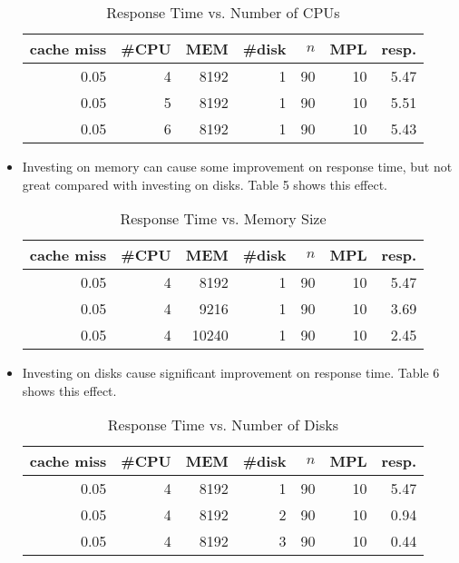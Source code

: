 \documentclass[12pt,letterpaper]{article}
\begin{document}
\begin{itemize}
\begin{table}
\begin{center}
\caption{Response Time vs. Number of CPUs}
\vspace{0.5ex}
\begin{tabular}{r|r|r|r|r|r|r}
cache miss & \#CPU & MEM & \#disk & $n$ & MPL & resp.\\
\hline
0.05 & 4 & 8192 & 1 & 90 & 10 & 5.47\\
0.05 & 5 & 8192 & 1 & 90 & 10 & 5.51\\
0.05 & 6 & 8192 & 1 & 90 & 10 & 5.43\\
\end{tabular}
\end{center}
\end{table}
\item Investing on memory can cause some improvement on response time, but not great compared with investing on disks. Table 5 shows this effect.
\begin{table}
\begin{center}
\caption{Response Time vs. Memory Size}
\vspace{0.5ex}
\begin{tabular}{r|r|r|r|r|r|r}
cache miss & \#CPU & MEM & \#disk & $n$ & MPL & resp.\\
\hline
0.05 & 4 & 8192 & 1 & 90 & 10 & 5.47\\
0.05 & 4 & 9216 & 1 & 90 & 10 & 3.69\\
0.05 & 4 & 10240 & 1 & 90 & 10 & 2.45\\
\end{tabular}
\end{center}
\end{table}
\item Investing on disks cause significant improvement on response time. Table 6 shows this effect.
\begin{table}
\begin{center}
\caption{Response Time vs. Number of Disks}
\vspace{0.5ex}
\begin{tabular}{r|r|r|r|r|r|r}
cache miss & \#CPU & MEM & \#disk & $n$ & MPL & resp.\\
\hline
0.05 & 4 & 8192 & 1 & 90 & 10 & 5.47\\
0.05 & 4 & 8192 & 2 & 90 & 10 & 0.94\\
0.05 & 4 & 8192 & 3 & 90 & 10 & 0.44\\
\end{tabular}
\end{center}
\end{table}
\end{itemize}
\end{document}
